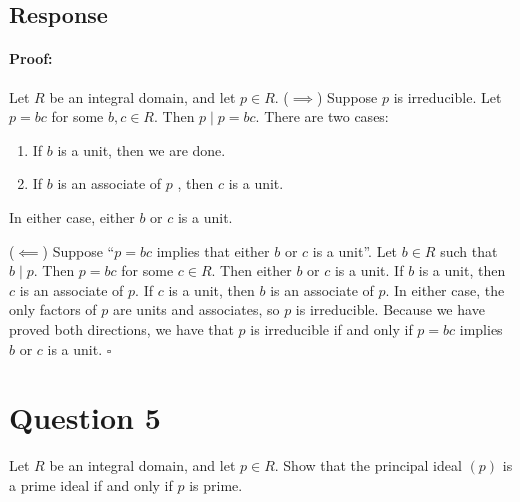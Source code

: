 \documentclass [12pt] {article}
\newenvironment{proof}{\paragraph{Proof:}}{\hfill$\square$}
\begin{document}
\subsection*{Response}
\begin{proof}
    Let $R$ be an integral domain, and let $p \in R$.
    \newline
    ($\implies$)
    Suppose $p$ is irreducible. Let $p = bc$ for some $b, c \in R$. Then $p \mid p = bc$. There are
    two cases:
    \begin{enumerate}[label=\textbf{Case \arabic*:}, leftmargin=*]
        \item If $b$ is a unit, then we are done.
        \item If $b$ is an associate of $p$ , then $c$ is a unit.
    \end{enumerate}
    In either case, either $b$ or $c$ is a unit.
    \vspace{1em}

    ($\impliedby$)
    Suppose ``$p = bc$ implies that either $b$ or $c$ is a unit''. Let $b \in R$ such that $b \mid p$.
    Then $p = bc$ for some $c \in R$. Then either $b$ or $c$ is a unit. If $b$ is a unit, then $c$
    is an associate of $p$. If $c$ is a unit, then $b$ is an associate of $p$. In either case, the
    only factors of $p$ are units and associates, so $p$ is irreducible. Because we have proved
    both directions, we have that $p$ is irreducible if and only if $p = bc$ implies $b$ or $c$ is
    a unit.
\end{proof}
\newpage


\section*{Question 5}
Let $R$ be an integral domain, and let $p\in R$. Show that the principal ideal $(p)$ is a prime
ideal if and only if $p$ is prime.
\end{document}
